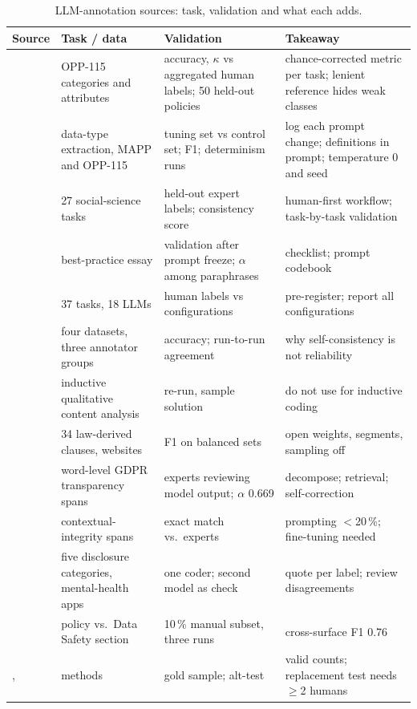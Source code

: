 \begin{table}[t]
\centering\small
\caption{LLM-annotation sources: task, validation and what each adds.}
\label{tab:L-sources}
\begin{tabularx}{\textwidth}{@{}P{2.6cm}P{3.1cm}P{3.3cm}Y@{}}
\toprule
\textbf{Source} & \textbf{Task / data} & \textbf{Validation} & \textbf{Takeaway}\\
\midrule
{} & OPP-115 categories and attributes & accuracy, $\kappa$ vs aggregated human labels; 50 held-out policies & chance-corrected metric per task; lenient reference hides weak classes\\
 & data-type extraction, MAPP and OPP-115 & tuning set vs control set; F1; determinism runs & log each prompt change; definitions in prompt; temperature 0 and seed\\
 & 27 social-science tasks & held-out expert labels; consistency score & human-first workflow; task-by-task validation\\
 & best-practice essay & validation after prompt freeze; $\alpha$ among paraphrases & checklist; prompt codebook\\
 & 37 tasks, 18 LLMs & human labels vs configurations & pre-register; report all configurations\\
 & four datasets, three annotator groups & accuracy; run-to-run agreement & why self-consistency is not reliability\\
 & inductive qualitative content analysis & re-run, sample solution & do not use for inductive coding\\
 & 34 law-derived clauses, websites & F1 on balanced sets & open weights, segments, sampling off\\
 & word-level GDPR transparency spans & experts reviewing model output; $\alpha$ 0.669 & decompose; retrieval; self-correction\\
 & contextual-integrity spans & exact match vs.\ experts & prompting $<$20\,\%; fine-tuning needed\\
 & five disclosure categories, mental-health apps & one coder; second model as check & quote per label; review disagreements\\
 & policy vs.\ Data Safety section & 10\,\% manual subset, three runs & cross-surface F1 0.76\\
,  & methods & gold sample; alt-test & valid counts; replacement test needs $\geq$2 humans\\
\bottomrule
\end{tabularx}
\end{table}

